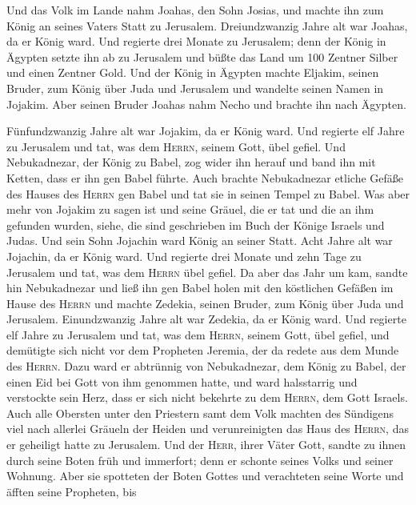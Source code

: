  Und das Volk im Lande nahm Joahas, den Sohn Josias, und
machte ihn zum König an seines Vaters Statt zu Jerusalem. 
Dreiundzwanzig Jahre alt war Joahas, da er König ward. Und regierte drei
Monate zu Jerusalem;  denn der König in Ägypten setzte ihn
ab zu Jerusalem und büßte das Land um 100 Zentner Silber und einen
Zentner Gold.  Und der König in Ägypten machte Eljakim,
seinen Bruder, zum König über Juda und Jerusalem und wandelte seinen
Namen in Jojakim. Aber seinen Bruder Joahas nahm Necho und brachte ihn
nach Ägypten.

 Fünfundzwanzig Jahre alt war Jojakim, da er König ward.
Und regierte elf Jahre zu Jerusalem und tat, was dem \textsc{Herrn},
seinem Gott, übel gefiel.  Und Nebukadnezar, der König zu
Babel, zog wider ihn herauf und band ihn mit Ketten, dass er ihn gen
Babel führte.  Auch brachte Nebukadnezar etliche Gefäße
des Hauses des \textsc{Herrn} gen Babel und tat sie in seinen Tempel zu
Babel.  Was aber mehr von Jojakim zu sagen ist und seine
Gräuel, die er tat und die an ihm gefunden wurden, siehe, die sind
geschrieben im Buch der Könige Israels und Judas. Und sein Sohn Jojachin
ward König an seiner Statt.  Acht Jahre alt war Jojachin,
da er König ward. Und regierte drei Monate und zehn Tage zu Jerusalem
und tat, was dem \textsc{Herrn} übel gefiel.  Da aber das
Jahr um kam, sandte hin Nebukadnezar und ließ ihn gen Babel holen mit
den köstlichen Gefäßen im Hause des \textsc{Herrn} und machte Zedekia,
seinen Bruder, zum König über Juda und Jerusalem. 
Einundzwanzig Jahre alt war Zedekia, da er König ward. Und regierte elf
Jahre zu Jerusalem  und tat, was dem \textsc{Herrn},
seinem Gott, übel gefiel, und demütigte sich nicht vor dem Propheten
Jeremia, der da redete aus dem Munde des \textsc{Herrn}. 
Dazu ward er abtrünnig von Nebukadnezar, dem König zu Babel, der einen
Eid bei Gott von ihm genommen hatte, und ward halsstarrig und verstockte
sein Herz, dass er sich nicht bekehrte zu dem \textsc{Herrn}, dem Gott
Israels.  Auch alle Obersten unter den Priestern samt dem
Volk machten des Sündigens viel nach allerlei Gräueln der Heiden und
verunreinigten das Haus des \textsc{Herrn}, das er geheiligt hatte zu
Jerusalem.  Und der \textsc{Herr}, ihrer Väter Gott,
sandte zu ihnen durch seine Boten früh und immerfort; denn er schonte
seines Volks und seiner Wohnung.  Aber sie spotteten der
Boten Gottes und verachteten seine Worte und äfften seine Propheten, bis
